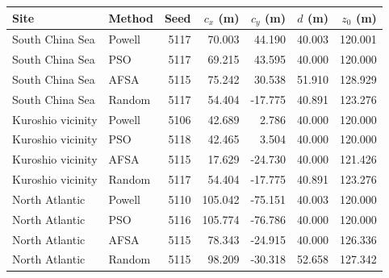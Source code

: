 \begin{tabular}{llrrrrr}
\toprule
Site & Method & Seed & $c_x$ (m) & $c_y$ (m) & $d$ (m) & $z_0$ (m) \\
\midrule
South China Sea & Powell & 5117 & 70.003 & 44.190 & 40.003 & 120.001 \\
South China Sea & PSO & 5117 & 69.215 & 43.595 & 40.000 & 120.000 \\
South China Sea & AFSA & 5115 & 75.242 & 30.538 & 51.910 & 128.929 \\
South China Sea & Random & 5117 & 54.404 & -17.775 & 40.891 & 123.276 \\
Kuroshio vicinity & Powell & 5106 & 42.689 & 2.786 & 40.000 & 120.000 \\
Kuroshio vicinity & PSO & 5118 & 42.465 & 3.504 & 40.000 & 120.000 \\
Kuroshio vicinity & AFSA & 5115 & 17.629 & -24.730 & 40.000 & 121.426 \\
Kuroshio vicinity & Random & 5117 & 54.404 & -17.775 & 40.891 & 123.276 \\
North Atlantic & Powell & 5110 & 105.042 & -75.151 & 40.003 & 120.000 \\
North Atlantic & PSO & 5116 & 105.774 & -76.786 & 40.000 & 120.000 \\
North Atlantic & AFSA & 5115 & 78.343 & -24.915 & 40.000 & 126.336 \\
North Atlantic & Random & 5115 & 98.209 & -30.318 & 52.658 & 127.342 \\
\bottomrule
\end{tabular}

